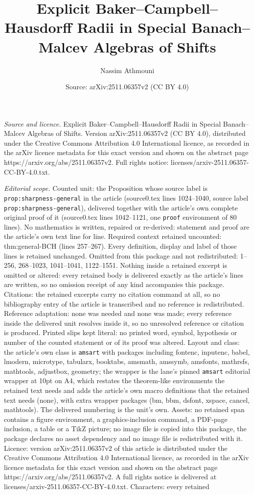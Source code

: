 \documentclass[10pt,a4paper]{amsart}
\title[Explicit Baker--Campbell--Hausdorff Radii in Special Banach-]{Explicit Baker--Campbell--Hausdorff Radii in Special Banach--Malcev Algebras of Shifts}
\author{Nassim Athmouni}
\date{Source: arXiv:2511.06357v2 (CC BY 4.0)}
\begin{document}
\maketitle

\noindent\emph{Source and licence.} Explicit Baker--Campbell--Hausdorff Radii in Special Banach--Malcev Algebras of Shifts. Version arXiv:2511.06357v2 (CC BY 4.0), distributed under the Creative Commons Attribution 4.0 International licence, as recorded in the arXiv licence metadata for this exact version and shown on the abstract page https://arxiv.org/abs/2511.06357v2. Full rights notice: licenses/arxiv-2511.06357-CC-BY-4.0.txt.\par\smallskip

\noindent\textit{Editorial scope.} Counted unit: the Proposition whose source label is \texttt{prop:sharpness-general} in the article (source0.tex lines 1024--1040, source label \texttt{prop:sharpness-general}), delivered together with the article's own complete original proof of it (source0.tex lines 1042--1121, one \texttt{proof} environment of 80 lines). No mathematics is written, repaired or re-derived: statement and proof are the article's own text line for line. Required context retained uncounted: thm:general-BCH (lines 257--267). Every definition, display and label of those lines is retained unchanged. Omitted from this package and not redistributed: 1--256, 268--1023, 1041--1041, 1122--1551. Nothing inside a retained excerpt is omitted or altered: every retained body is delivered exactly as the article's lines are written, so no omission receipt of any kind accompanies this package. Citations: the retained excerpts carry no citation command at all, so no bibliography entry of the article is transcribed and no reference is redistributed. Reference adaptation: none was needed and none was made; every reference inside the delivered unit resolves inside it, so no unresolved reference or citation is produced. Printed slips kept literal: no printed word, symbol, hypothesis or number of the counted statement or of its proof was altered. Layout and class: the article's own class is \texttt{amsart} with packages including fontenc, inputenc, babel, lmodern, microtype, tabularx, booktabs, amsmath, amssymb, amsfonts, mathrsfs, mathtools, adjustbox, geometry; the wrapper is the lane's pinned \texttt{amsart} editorial wrapper at 10pt on A4, which restates the theorem-like environments the retained text needs and adds the article's own macro definitions that the retained text needs (none), with extra wrapper packages (bm, bbm, dsfont, xspace, cancel, mathtools). The delivered numbering is the unit's own. Assets: no retained span contains a figure environment, a graphics-inclusion command, a PDF-page inclusion, a table or a TikZ picture; no image file is copied into this package, the package declares no asset dependency and no image file is redistributed with it. Licence: version arXiv:2511.06357v2 of this article is distributed under the Creative Commons Attribution 4.0 International licence, as recorded in the arXiv licence metadata for this exact version and shown on the abstract page https://arxiv.org/abs/2511.06357v2. A full rights notice is delivered at licenses/arxiv-2511.06357-CC-BY-4.0.txt. Characters: every retained 
\end{document}

